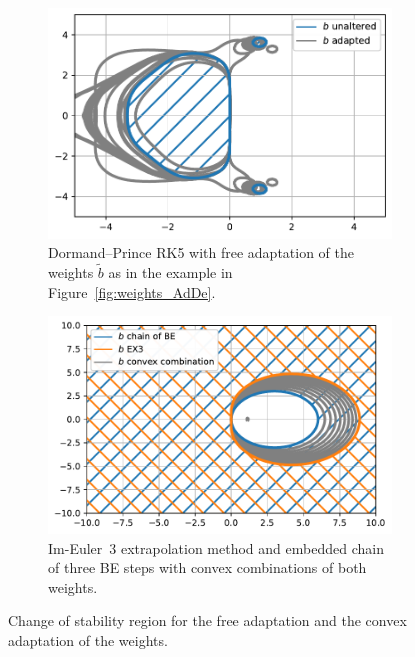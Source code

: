 \documentclass[a4paper]{article}
\numberwithin{equation}{section}
\theoremstyle{plain}
\theoremstyle{definition}
\numberwithin{theorem}{section}
\newcommand{\1}{\mathbbm{1}}
\newcommand{\bt}{\tilde{b}}
\begin{document}
\begin{figure}
     \centering
     \begin{subfigure}[b]{0.45\textwidth}
         \centering
         \includegraphics[width=\textwidth]{plots/stab_dp5.pdf}
         \caption{Dormand--Prince RK5 with free adaptation
                   of the weights $\bt$ as in the example in Figure~\ref{fig:weights_AdDe}.}
         \label{fig:stab_dp5}
     \end{subfigure}
     \hfill
     \begin{subfigure}[b]{0.45\textwidth}
         \centering
         \includegraphics[width=\textwidth]{plots/stab_ex3.pdf}
         \caption{Im-Euler~3 extrapolation method and embedded chain
                  of three BE steps with convex combinations of both
                  weights.}
         \label{fig:stab_ex3}
     \end{subfigure}
        \caption{Change of stability region for the free adaptation and
                 the convex adaptation of the weights.}
        \label{fig:stab}
\end{figure}
\end{document}
